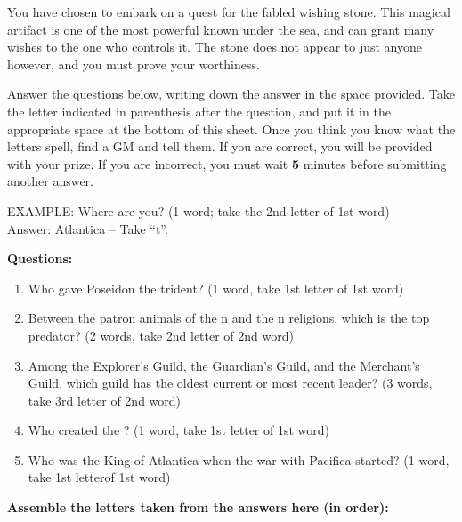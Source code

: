 \documentclass[green]{NeptuneBall}
\begin{document}
\name{\gWS{}}

You have chosen to embark on a quest for the fabled wishing stone. This magical artifact is one of the most powerful known under the sea, and can grant many wishes to the one who controls it. The stone does not appear to just anyone however, and you must prove your worthiness.

Answer the questions below, writing down the answer in the space provided. Take the letter indicated in parenthesis after the question, and put it in the appropriate space at the bottom of this sheet. Once you think you know what the letters spell, find a GM and tell them. If you are correct, you will be provided with your prize. If you are incorrect, you must wait {\bf 5} minutes before submitting another answer.

EXAMPLE:
Where are you? (1 word; take the 2nd letter of 1st word)\\
Answer: Atlantica  -- Take ``t''.
		

{\bf Questions:}
\begin{enumerate}
 \item Who gave Poseidon the trident? (1 word, take 1st letter of 1st word) \vspace{5 mm}\\  \underline{\hspace{15cm}}
 \item Between the patron animals of the \pPacifica{}n and the \pAtlantis{}n religions, which is the top predator? (2 words, take 2nd letter of 2nd word)\\ \underline{\hspace{15cm}}
	\item Among the Explorer's Guild, the Guardian's Guild, and the Merchant's Guild, which guild has the oldest current or most recent leader? (3 words, take 3rd letter of 2nd word)\\ \underline{\hspace{15cm}}
	\item Who created the \sArtifactTwo{}? (1 word, take 1st letter of 1st word)\\ \underline{\hspace{15cm}}
	\item Who was the King of Atlantica when the war with Pacifica started? (1 word, take 1st letterof 1st word)\\ \underline{\hspace{15cm}}
\end{enumerate}

{\bf Assemble the letters taken from the answers here (in order):}
\end{document}
